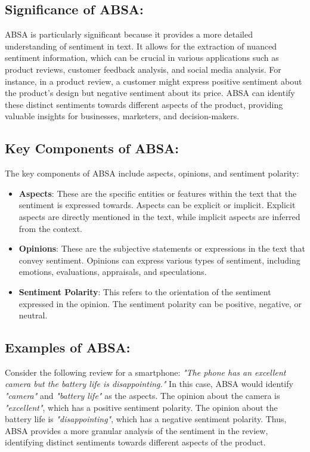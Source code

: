\documentclass{article}
\begin{document}
\subsection{Significance of ABSA:}
ABSA is particularly significant because it provides a more detailed understanding of sentiment in text. It allows for the extraction of nuanced sentiment information, which can be crucial in various applications such as product reviews, customer feedback analysis, and social media analysis. For instance, in a product review, a customer might express positive sentiment about the product's design but negative sentiment about its price. ABSA can identify these distinct sentiments towards different aspects of the product, providing valuable insights for businesses, marketers, and decision-makers. \cite{doi:10.1504/IJESMS.2021.119892}\cite{Jiang2023AspectBasedSA}

\subsection{Key Components of ABSA:}
The key components of ABSA include aspects, opinions, and sentiment polarity:
\begin{itemize}
  \item \textbf{Aspects}: These are the specific entities or features within the text that the sentiment is expressed towards. Aspects can be explicit or implicit. Explicit aspects are directly mentioned in the text, while implicit aspects are inferred from the context.\cite{hua2023systematic} \cite{NazirIssues&Chall2023}
  \item \textbf{Opinions}: These are the subjective statements or expressions in the text that convey sentiment. Opinions can express various types of sentiment, including emotions, evaluations, appraisals, and speculations.\cite{hua2023systematic}
  \item \textbf{Sentiment Polarity}: This refers to the orientation of the sentiment expressed in the opinion. The sentiment polarity can be positive, negative, or neutral.\cite{hua2023systematic}\cite{NazirIssues&Chall2023}
\end{itemize}

\subsection{Examples of ABSA: }
Consider the following review for a smartphone: \textit{"The phone has an excellent camera but the battery life is disappointing."} In this case, ABSA would identify \textit{"camera"} and \textit{"battery life"} as the aspects. The opinion about the camera is \textit{"excellent"}, which has a positive sentiment polarity. The opinion about the battery life is \textit{"disappointing"}, which has a negative sentiment polarity. Thus, ABSA provides a more granular analysis of the sentiment in the review, identifying distinct sentiments towards different aspects of the product.\cite{hua2023systematic}
\end{document}
